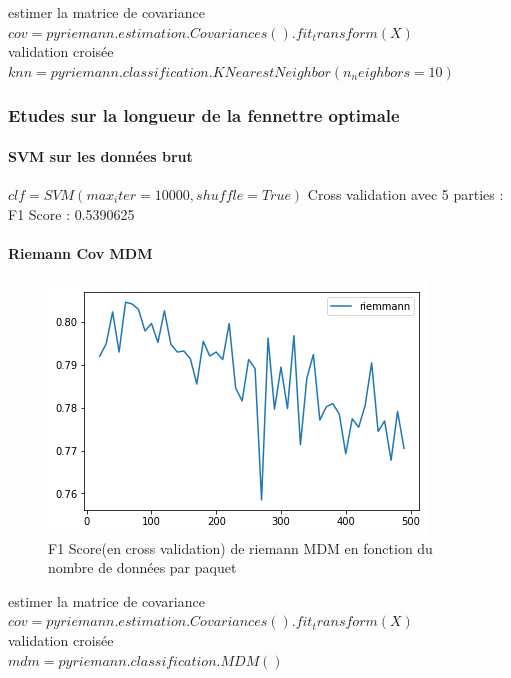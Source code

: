 \documentclass{article}
\begin{document}
estimer la matrice de covariance\\
$
cov = pyriemann.estimation.Covariances().fit_transform(X)
$
\\
validation croisée\\
$
knn = pyriemann.classification.KNearestNeighbor(n_neighbors=10)
$


\subsubsection{Etudes sur la longueur de la fennettre optimale}

\paragraph{SVM sur les données brut}
$
clf = SVM(max_iter=10000,shuffle=True)
$
Cross validation avec 5 parties :\\
F1 Score : 0.5390625

\paragraph{Riemann Cov MDM }
\begin{figure}[H]
\begin{center}
\includegraphics[scale=0.7]{images/riemann_cov_MDM_f1Score.png}
\end{center}
\caption{F1 Score(en cross validation) de riemann MDM en fonction du nombre de données par paquet}
\end{figure}

estimer la matrice de covariance\\
$
cov = pyriemann.estimation.Covariances().fit_transform(X)
$
\\
validation croisée\\
$
mdm = pyriemann.classification.MDM()
$
\end{document}
